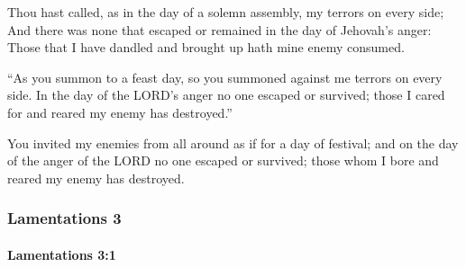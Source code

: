 			\begin{versebox}
					\item[BHS] 
					\item[LXX] 
					\item[ASV] Thou hast called, as in the day of a solemn assembly, my terrors on every side; And there was none that escaped or remained in the day of Jehovah's anger: Those that I have dandled and brought up hath mine enemy consumed.
					\item[NIV] “As you summon to a feast day, so you summoned against me terrors on every side. In the day of the LORD’s anger no one escaped or survived; those I cared for and reared my enemy has destroyed.”
					\item[NRSV] You invited my enemies from all around as if for a day of festival; and on the day of the anger of the LORD no one escaped or survived; those whom I bore and reared my enemy has destroyed.
			\end{versebox}
	\subsubsection{Lamentations 3} %
		\label{LAMENTATIONS-3}

		\paragraph{Lamentations 3:1} %
			\label{LAMENTATIONS-3-1}

